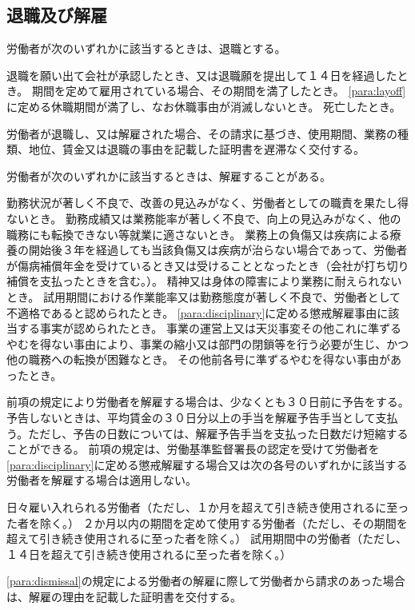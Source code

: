 \documentclass[10pt,a4paper,uplatex]{jsarticle}
\begin{document}
\subsection{退職及び解雇}

労働者が次のいずれかに該当するときは、退職とする。
\begin{enumerate}
    \itm 退職を願い出て会社が承認したとき、又は退職願を提出して１４日を経過したとき。
    \itm 期間を定めて雇用されている場合、その期間を満了したとき。
    \itm \ref{para:layoff}に定める休職期間が満了し、なお休職事由が消滅しないとき。
    \itm 死亡したとき。
\end{enumerate}
\term
労働者が退職し、又は解雇された場合、その請求に基づき、使用期間、業務の種類、地位、賃金又は退職の事由を記載した証明書を遅滞なく交付する。

労働者が次のいずれかに該当するときは、解雇することがある。
\label{para:dismissal}
\begin{enumerate}
    \itm 勤務状況が著しく不良で、改善の見込みがなく、労働者としての職責を果たし得ないとき。
    \itm 勤務成績又は業務能率が著しく不良で、向上の見込みがなく、他の職務にも転換できない等就業に適さないとき。
    \itm 業務上の負傷又は疾病による療養の開始後３年を経過しても当該負傷又は疾病が治らない場合であって、労働者が傷病補償年金を受けているとき又は受けることとなったとき（会社が打ち切り補償を支払ったときを含む。）。
    \itm 精神又は身体の障害により業務に耐えられないとき。
    \itm 試用期間における作業能率又は勤務態度が著しく不良で、労働者として不適格であると認められたとき。
    \itm \ref{para:disciplinary}に定める懲戒解雇事由に該当する事実が認められたとき。
    \itm 事業の運営上又は天災事変その他これに準ずるやむを得ない事由により、事業の縮小又は部門の閉鎖等を行う必要が生じ、かつ他の職務への転換が困難なとき。
    \itm その他前各号に準ずるやむを得ない事由があったとき。
\end{enumerate}
\term
前項の規定により労働者を解雇する場合は、少なくとも３０日前に予告をする。予告しないときは、平均賃金の３０日分以上の手当を解雇予告手当として支払う。ただし、予告の日数については、解雇予告手当を支払った日数だけ短縮することができる。
\term
前項の規定は、労働基準監督署長の認定を受けて労働者を\ref{para:disciplinary}に定める懲戒解雇する場合又は次の各号のいずれかに該当する労働者を解雇する場合は適用しない。
\begin{enumerate}
    \itm 日々雇い入れられる労働者（ただし、１か月を超えて引き続き使用されるに至った者を除く。）
    \itm ２か月以内の期間を定めて使用する労働者（ただし、その期間を超えて引き続き使用されるに至った者を除く。）
    \itm 試用期間中の労働者（ただし、１４日を超えて引き続き使用されるに至った者を除く。）
\end{enumerate}
\term
\ref{para:dismissal}の規定による労働者の解雇に際して労働者から請求のあった場合は、解雇の理由を記載した証明書を交付する。
\end{document}
